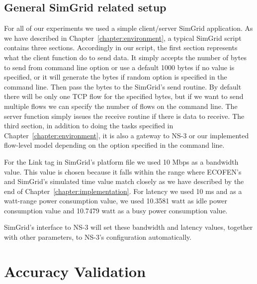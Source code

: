 \subsection{General SimGrid related setup}
For all of our experiments we used a simple client/server SimGrid application. As we have described in Chapter~\ref{chapter:environment}, a typical SimGrid script contains three sections. Accordingly in our script, the first section represents what the client function do to send data. It simply accepts the number of bytes to send from command line option or use a default 1000 bytes if no value is specified, or it will generate the bytes if random option is specified in the command line. Then pass the bytes to the SimGrid's send routine. By default there will be only one TCP flow for the specified bytes, but if we want to send multiple flows we can specify the number of flows on the command line. The server function simply issues the receive routine if there is data to receive. The third section, in addition to doing the tasks specified in Chapter~\ref{chapter:environment},  it is also a gateway to NS-3 or our implemented flow-level model depending on the option specified in the command line. 

For the Link tag in SimGrid's platform file we used 10 Mbps  as a bandwidth value. This value is chosen because it falls within the range where ECOFEN's and SimGrid's simulated time value match closely as we have described by the end of Chapter~\ref{chapter:implementation}. For latency we used 10 ms and as a watt-range power consumption value, we used 10.3581 watt as idle power consumption value and 10.7479 watt as a busy power consumption value. 

SimGrid's interface to NS-3 will set these bandwidth and latency values, together with other parameters, to NS-3's configuration automatically. 

\section{Accuracy Validation}

